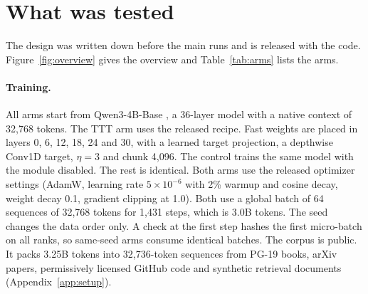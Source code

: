 \documentclass{article}
\begin{document}
\section{What was tested}

The design was written down before the main runs and is released with the code. Figure~\ref{fig:overview} gives the overview and Table~\ref{tab:arms} lists the arms.

\begin{table}[t]
\caption{Arms. The update-off rows are the TTT checkpoints evaluated with $\eta = 0$, so no separate model is trained. The 1B-token checkpoints of the two main arms (step 477) are the chunk-4,096 and control references for the chunk ablation.}
\label{tab:arms}
\centering
\footnotesize
{}
\end{table}

\paragraph{Training.} All arms start from Qwen3-4B-Base \citep{yang2025qwen3, qwen3_4b_base}, a 36-layer model with a native context of 32,768 tokens. The TTT arm uses the released recipe. Fast weights are placed in layers 0, 6, 12, 18, 24 and 30, with a learned target projection, a depthwise Conv1D target, $\eta = 3$ and chunk 4,096. The control trains the same model with the module disabled. The rest is identical. Both arms use the released optimizer settings (AdamW, learning rate $5 \times 10^{-6}$ with 2\% warmup and cosine decay, weight decay 0.1, gradient clipping at 1.0). Both use a global batch of 64 sequences of 32,768 tokens for 1,431 steps, which is 3.0B tokens. The seed changes the data order only. A check at the first step hashes the first micro-batch on all ranks, so same-seed arms consume identical batches. The corpus is public. It packs 3.25B tokens into 32,736-token sequences from PG-19 books, arXiv papers, permissively licensed GitHub code and synthetic retrieval documents (Appendix~\ref{app:setup}).
\end{document}
